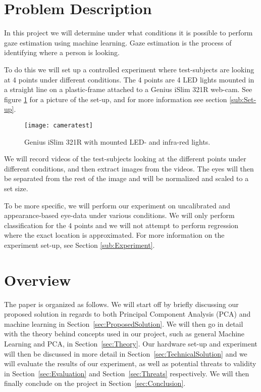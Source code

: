 \section{Problem Description}
In this project we will determine under what conditions it is possible to perform gaze estimation using machine learning.
Gaze estimation is the process of identifying where a person is looking.

To do this we will set up a controlled experiment where test-subjects are looking at 4 points under different conditions.
The 4 points are 4 LED lights mounted in a straight line on a plastic-frame attached to a Genius iSlim 321R web-cam.
See figure \ref{fig:webcamsetup} for a picture of the set-up, and for more information see section \ref{sub:Set-up}.

\begin{figure}[h!]
\centering
\texttt{[image: cameratest]}
\caption{Genius iSlim 321R with mounted LED- and infra-red lights.}
\label{fig:webcamsetup}
\end{figure}

We will record videos of the test-subjects looking at the different points under different conditions, and then extract images from the videos.
The eyes will then be separated from the rest of the image and will be normalized and scaled to a set size.

To be more specific, we will perform our experiment on uncalibrated and appearance-based eye-data under various conditions.
We will only perform classification for the 4 points and we will not attempt to perform regression \cite{hansen2010eye} where the exact location is approximated.
For more information on the experiment set-up, see Section \ref{sub:Experiment}.

\section{Overview}
The paper is organized as follows. We will start off by briefly discussing our proposed solution in regards to both Principal Component Analysis (PCA) and machine learning in Section~\ref{sec:ProposedSolution}.
We will then go in detail with the theory behind concepts used in our project, such as general Machine Learning and PCA, in Section~\ref{sec:Theory}. 
Our hardware set-up and experiment will then be discussed in more detail in Section~\ref{sec:TechnicalSolution} and we will evaluate the results of our experiment, as well as potential threats to validity in Section~\ref{sec:Evaluation} and Section~\ref{sec:Threats} respectively. 
We will then finally conclude on the project in Section~\ref{sec:Conclusion}.

